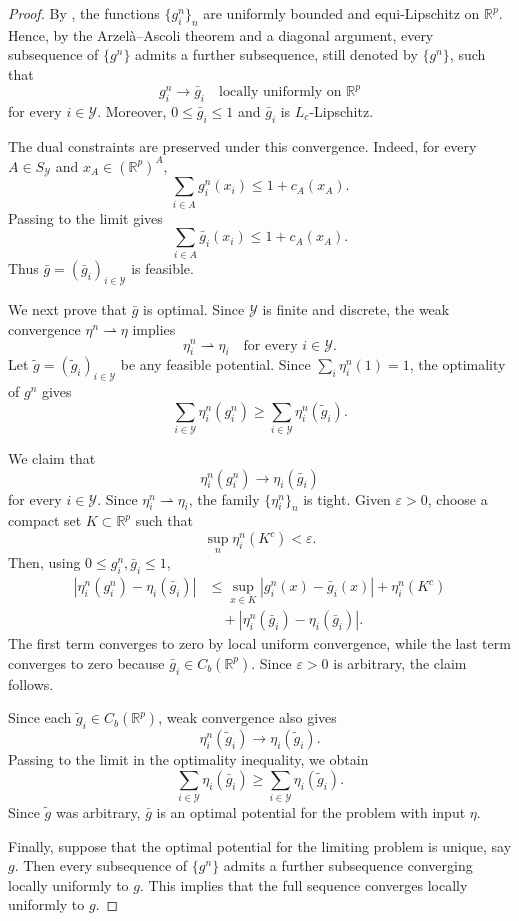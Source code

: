 \documentclass[10pt,a4paper]{amsart}
\begin{document}
\begin{proof}
By , the functions
$\{g_i^n\}_n$ are uniformly bounded and equi-Lipschitz on
$\mathbb R^p$. Hence, by the Arzelà--Ascoli theorem and a diagonal
argument, every subsequence of $\{g^n\}$ admits a further subsequence,
still denoted by $\{g^n\}$, such that
\[
    g_i^n\longrightarrow\bar g_i
    \quad
    \text{locally uniformly on }\mathbb R^p
\]
for every $i\in\mathcal Y$. Moreover,
$0\leq\bar g_i\leq1$ and $\bar g_i$ is $L_c$-Lipschitz.

The dual constraints are preserved under this convergence. Indeed, for
every $A\in S_{\mathcal Y}$ and
$x_A\in(\mathbb R^p)^A$,
\[
    \sum_{i\in A}g_i^n(x_i)
    \leq
    1+c_A(x_A).
\]
Passing to the limit gives
\[
    \sum_{i\in A}\bar g_i(x_i)
    \leq
    1+c_A(x_A).
\]
Thus $\bar g=(\bar g_i)_{i\in\mathcal Y}$ is feasible.

We next prove that $\bar g$ is optimal. Since $\mathcal Y$ is finite
and discrete, the weak convergence $\eta^n\rightharpoonup\eta$
implies
\[
    \eta_i^n\rightharpoonup\eta_i
    \quad
    \text{for every }i\in\mathcal Y.
\]
Let
$\widetilde g=(\widetilde g_i)_{i\in\mathcal Y}$ be any feasible
potential. Since $\sum_i\eta_i^n(1)=1$, the optimality of $g^n$ gives
\[
    \sum_{i\in\mathcal Y}\eta_i^n(g_i^n)
    \geq
    \sum_{i\in\mathcal Y}\eta_i^n(\widetilde g_i).
\]

We claim that
\[
    \eta_i^n(g_i^n)
    \longrightarrow
    \eta_i(\bar g_i)
\]
for every $i\in\mathcal Y$. Since
$\eta_i^n\rightharpoonup\eta_i$, the family
$\{\eta_i^n\}_n$ is tight. Given $\varepsilon>0$, choose a compact set
$K\subset\mathbb R^p$ such that
\[
    \sup_n\eta_i^n(K^c)<\varepsilon.
\]
Then, using $0\leq g_i^n,\bar g_i\leq1$,
\begin{align*}
    \left|
        \eta_i^n(g_i^n)-\eta_i(\bar g_i)
    \right|
    &\leq
    \sup_{x\in K}|g_i^n(x)-\bar g_i(x)|
    +\eta_i^n(K^c) \\
    &\quad
    +
    \left|
        \eta_i^n(\bar g_i)-\eta_i(\bar g_i)
    \right|.
\end{align*}
The first term converges to zero by local uniform convergence, while
the last term converges to zero because
$\bar g_i\in C_b(\mathbb R^p)$. Since $\varepsilon>0$ is arbitrary,
the claim follows.

Since each $\widetilde g_i\in C_b(\mathbb R^p)$, weak convergence also
gives
\[
    \eta_i^n(\widetilde g_i)
    \longrightarrow
    \eta_i(\widetilde g_i).
\]
Passing to the limit in the optimality inequality, we obtain
\[
    \sum_{i\in\mathcal Y}\eta_i(\bar g_i)
    \geq
    \sum_{i\in\mathcal Y}\eta_i(\widetilde g_i).
\]
Since $\widetilde g$ was arbitrary, $\bar g$ is an optimal potential
for the problem with input $\eta$.

Finally, suppose that the optimal potential for the limiting problem is
unique, say $g$. Then every subsequence of $\{g^n\}$ admits a further
subsequence converging locally uniformly to $g$. This implies that
the full sequence converges locally uniformly to $g$.
\end{proof}
\end{document}
